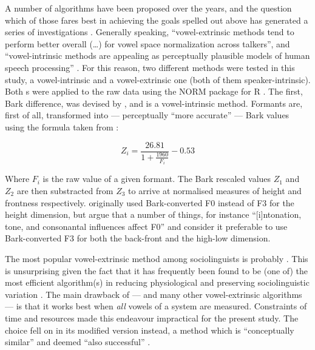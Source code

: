 A number of algorithms have been proposed over the years, and the question which of those fares best in achieving the goals spelled out above has generated a series of investigations \parencites(among others:)(){hindle1978}{disner1980}{adanketal2004}.
Generally speaking, ``vowel-extrinsic methods tend to perform better overall (\ldots) for vowel space normalization across talkers'', and ``vowel-intrinsic methods are appealing as perceptually plausible models of human speech processing'' \parencite[1440]{clopper2009}.
For this reason, two different  methods were tested in this study, a vowel-intrinsic and a vowel-extrinsic one (both of them speaker-intrinsic).
Both s were applied to the raw data using the NORM package for R \parencite{kendallthomas2014}.
The first, Bark difference, was devised by \textcite{syrdalgopal1986}, and is a vowel-intrinsic method.
Formants are, first of all, transformed into --- perceptually ``more accurate'' \parencite[1431--1432]{clopper2009} --- Bark values using the formula taken from \textcite{traunmueller1990}:

\begin{equation}
	Z_{i} = \frac{26.81}{1 + \frac{1960}{F_{i}}} - 0.53
\end{equation}

Where \(F_{i}\) is the raw value of a given formant. The Bark rescaled values \(Z_{1}\) and \(Z_{2}\) are then substracted from \(Z_{3}\) to arrive at normalised measures of height and frontness respectively. \citeauthor{syrdalgopal1986} originally used Bark-converted F0 instead of F3 for the height dimension, but \textcite{kendallthomas2014} argue that a number of things, for instance ``[i]ntonation, tone, and consonantal influences affect F0'' and consider it preferable to use Bark-converted F3 for both the back-front and the high-low dimension.

The most popular vowel-extrinsic  method among sociolinguists is probably \textcite{lobanov1971}.
This is unsurprising given the fact that it has frequently been found to be (one of) the most efficient algorithm(s) in reducing physiological and preserving sociolinguistic variation \parencite[cf.][1440]{clopper2009}.
The main drawback of \citeauthor{lobanov1971} --- and many other vowel-extrinsic algorithms --- is that it works best when \emph{all} vowels of a system are measured.
Constraints of time and resources made this endeavour impractical for the present study.
The choice fell on \textcite{wattfabricius2002} in its modified version \parencite{fabriciusetal2009} instead, a method which is ``conceptually similar'' and deemed ``also successful'' \parencite[1440]{clopper2009}.


